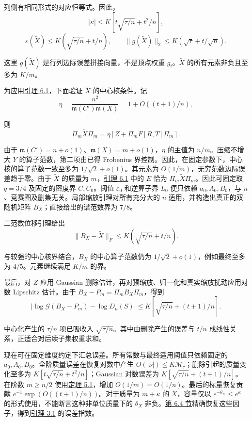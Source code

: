 \documentclass[11pt,a4paper]{article}
\newcommand{\paperref}[2]{\hyperref[#1]{#2}}
\begin{document}
列侧有相同形式的对应恒等式。因此，
\[|\kappa|\le K\left[t\sqrt{\tau/n}+t^2/n\right],\]
\nopagebreak[3]\[\varepsilon(\widetilde X)\le K(\sqrt{\tau/n}+t/n),\qquad \|g(\widetilde X)\|_2\le K(\sqrt\tau+t/\sqrt n).\]

这里 \(g(\widetilde X)\) 是行列边际误差拼接向量，不是顶点权重 \(g_i\)。\(\widetilde X\) 的所有元素非负且至多为 \(K/m\)。

为应用\paperref{thm-6.1}{引理 6.1}，下面验证 \(\widetilde X\) 的中心核条件。记
\[\eta=\frac{n^2}{\mathfrak m(C')\mathfrak m(X)}=1+O((t+1)/n),\]

则
\[\Pi_m\widetilde X\Pi_m=\eta\left[Z+\Pi_mF[R,T]\Pi_m\right].\]

由于 \(\mathfrak m(C')=n+o(1)\)、\(\mathfrak m(X)=m+o(1)\)，\(\eta\) 的主值为 \(n/m\)。压缩不增大 \(Y\) 的算子范数，第二项由已得 Frobenius 界控制。因此，在固定参数下，中心核的算子范数一致至多为 \(1/\sqrt2+o(1)\)。其元素为 \(O(1/m)\)，无穷范数边际误差趋于零。由于 \(\widetilde X\) 的质量为 \(m\)，\paperref{thm-6.1}{引理 6.1} 中的 \(E\) 恰为 \(\Pi_m\widetilde X\Pi_m\)。因此可固定取 \(q=3/4\) 及固定的密度界 \(C,C_0\)。阈值 \(\varepsilon_0\) 和逆算子界 \(L_0\) 便只依赖 \(a_0,A_0,B_0\)，与 \(n\)、竞赛图及删集无关。局部缩放引理对所有充分大的 \(n\) 适用，并构造出真正的双随机矩阵 \(B_X\)；直接给出的谱范数界为 \(7/8\)。

二范数位移引理给出
\[\|B_X-\widetilde X\|_F\le K(\sqrt{\tau/n}+t/n).\]

与较强的中心核界结合，\(B_X\) 的中心算子范数仍为 \(1/\sqrt2+o(1)\)，例如最终至多为 \(4/5\)。元素继续满足 \(K/m\) 的界。

最后，对 \(Z\) 应用 Gaussian 删除估计，再对预缩放、归一化和真实缩放扰动应用对数 Lipschitz 估计。由于 \(B_X-P_m=\Pi_mB_X\Pi_m\)，得到
\[|\log\mathcal G(B_X-P_m)-\log D_n(S)|\le K\left[\sqrt{\tau/n}+(t+1)/n\right].\]

中心化产生的 \(\tau/n\) 项已吸收入 \(\sqrt{\tau/n}\)。其中由删除产生的误差与 \(t/n\) 成线性关系，正适合对后续子集权重求和。

现在可在固定维度约定下汇总误差。所有常数与最终适用阈值只依赖固定的 \(a_0,A_0,B_0\)。全阶质量误差在恢复对数中产生 \(O(|\nu|)\le K\mathcal M_\tau\)；删除引起的质量变化至多为 \(K[t\sqrt{\tau/n}+t^2/n]\)；Gaussian 对数误差为 \(K[\sqrt{\tau/n}+(t+1)/n]\)。在阶数 \(m\ge n/2\) 使用\paperref{thm-5.1}{定理 5.1}，增加 \(O(1/m)=O(1/n)\)。最后的标量恢复贡献 \(e^{-1}\exp(O((t+1)/n))\)。对于质量为 \(m+\kappa\) 的 \(X\)，容量仅以 \(e^{-\theta_X}\le e^\kappa\) 的形式使用，不能断言这种非单位质量下的 \(\theta_X\) 非负。\paperref{sec-6.4}{第 6.4 节}精确恢复这些因子，得到\paperref{thm-3.1}{引理 3.1} 的误差指数。
\end{document}
